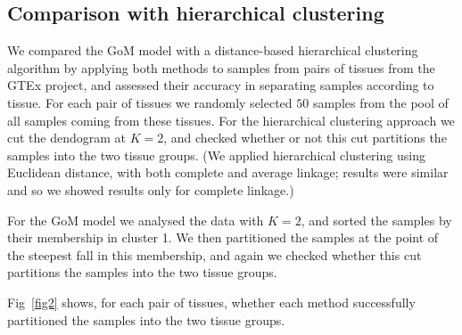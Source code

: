 \documentclass[10pt,letterpaper]{article}
\begin{document}
%


\subsection*{Comparison with hierarchical clustering}

We compared the GoM model with a distance-based hierarchical clustering algorithm by applying both methods to samples from
pairs of tissues from the GTEx project, and assessed their accuracy in
separating samples according to tissue.  For each pair of tissues  we randomly selected $50$ samples from the pool of all samples coming from these tissues.
For the hierarchical clustering approach we cut the dendogram at $K=2$, and checked whether or not this cut partitions the samples into the two tissue groups.
(We applied hierarchical clustering using Euclidean distance, with both complete and average linkage; results were similar and so we showed results only for complete linkage.)

For the GoM model we analysed the data with $K=2$, and sorted the samples by their membership in cluster 1. We then partitioned the samples at the point of the steepest fall in this membership, and again we checked whether this cut partitions the samples into the two tissue groups.


Fig~\ref{fig2} shows, for each pair of tissues, whether each method successfully partitioned the samples into the two tissue groups.
\end{document}
